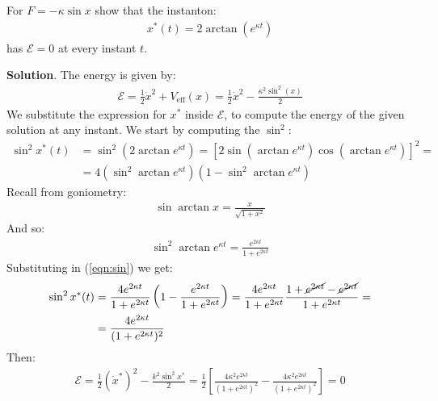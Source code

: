 \documentclass[../template.tex]{subfiles}
\begin{document}
\begin{exo}
    For $F=-\kappa \sin x$ show that the instanton:
    \begin{align*}
        x^*(t) = 2\arctan (e^{\kappa t})
    \end{align*}
    has  $\mathcal{E}=0$ at every instant $t$.

    \medskip

    \textbf{Solution}. The energy is given by:
    \begin{align*}
        \mathcal{E}= \frac{1}{2} \dot{x}^2 + V_{\mathrm{eff}}(x) = \frac{1}{2} \dot{x}^2 - \frac{\kappa^2 \sin^2(x)}{2}   
    \end{align*}
    We substitute the expression for $x^*$ inside $\mathcal{E}$, to compute the energy of the given solution at any instant. We start by computing the $\sin^2$:
    \begin{align} \nonumber
        \sin^2 x^*(t) &= \sin^2 (2 \arctan e^{\kappa t}) = [2 \sin(\arctan e^{\kappa t})\cos(\arctan e^{\kappa t})]^2 =\\
        &= 4 (\sin^2 \arctan e^{\kappa t})(1-\sin^2 \arctan e^{\kappa t}) \label{eqn:sin}
    \end{align}
    Recall from goniometry:
    \begin{align*}
        \sin\arctan x = \frac{x}{\sqrt{1+x^2}} 
    \end{align*}
    And so:
    \begin{align*}
        \sin^2 \arctan e^{\kappa t} = \frac{e^{2\kappa t}}{1 + e^{2 \kappa t}} 
    \end{align*}
    Substituting in (\ref{eqn:sin}) we get:
    \begin{align*}
        \sin^2 x^*(t) &= \frac{4 e^{2\kappa t}}{1 + e^{2 \kappa t}}  \left(1-\frac{e^{2 \kappa t}}{1 + e^{2 \kappa t}} \right) = \frac{4 e^{2 \kappa t}}{1 + e^{2 \kappa t}} \frac{1 + \cancel{e^{2 \kappa t} }-\cancel{ e^{2\kappa t}}}{1+ e^{2 \kappa t}} =\\
        &= \frac{4 e^{2\kappa t}}{(1+e^{2 \kappa t})^2}   
    \end{align*}
    Then:
    \begin{align*}
        \mathcal{E}=\frac{1}{2} (\dot{x}^*)^2 - \frac{k^2 \sin^2 x^*}{2} = \frac{1}{2} \left[\frac{4 \kappa^2 e^{2 \kappa t}}{(1+e^{2 \kappa t})^2} - \frac{4 \kappa^2 e^{2 \kappa t}}{(1+e^{2 \kappa t})^2}  \right] = 0
    \end{align*}
\end{exo}
\end{document}

